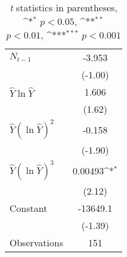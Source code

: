 \begin{table}[h!]\centering
\def\sym#1{\ifmmode^{#1}\else\(^{#1}\)\fi}
\begin{tabular}{l*{1}{c}}
\hline\hline
$N_{t-1}$             &      -3.953         \\
                    &     (-1.00)         \\
$\hat Y \ln \hat Y$      &       1.606         \\
                    &      (1.62)         \\
$\hat Y (\ln \hat Y)^2$ &      -0.158         \\
                    &     (-1.90)         \\
$\hat Y (\ln \hat Y)^3$ &     0.00493\sym{*}  \\
                    &      (2.12)         \\
Constant            &    -13649.1         \\
                    &     (-1.39)         \\
\hline
Observations        &         151         \\
\hline\hline
\end{tabular}
    \caption{\textit{t} statistics in parentheses, \sym{*} \(p<0.05\), \sym{**} \(p<0.01\), \sym{***} \(p<0.001\)}
\end{table}
